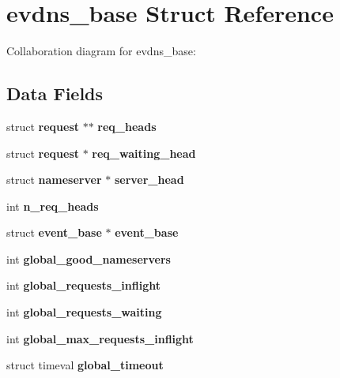 \section{evdns\-\_\-base \-Struct \-Reference}
\label{structevdns__base}


\-Collaboration diagram for evdns\-\_\-base\-:
\subsection*{\-Data \-Fields}
\begin{DoxyCompactItemize}
\item 
struct {\bf request} $\ast$$\ast$ {\bfseries req\-\_\-heads}\label{structevdns__base_a346219f57344018a7d4c3364cd47fd04}

\item 
struct {\bf request} $\ast$ {\bfseries req\-\_\-waiting\-\_\-head}\label{structevdns__base_acc93b195bd8704c1e13c8f2f7785ad0e}

\item 
struct {\bf nameserver} $\ast$ {\bfseries server\-\_\-head}\label{structevdns__base_abce33d9e0dba60766332c701af8c7a9f}

\item 
int {\bfseries n\-\_\-req\-\_\-heads}\label{structevdns__base_ac76cdaa1c35241e412a1c8d8d7661229}

\item 
struct {\bf event\-\_\-base} $\ast$ {\bfseries event\-\_\-base}\label{structevdns__base_ac1c1d71aa37cb71608f4f802bb85b200}

\item 
int {\bfseries global\-\_\-good\-\_\-nameservers}\label{structevdns__base_ad4dee3132b0efd37b89c8b27fe6f4596}

\item 
int {\bfseries global\-\_\-requests\-\_\-inflight}\label{structevdns__base_aac7a85997a48c47cb5055849b41edb67}

\item 
int {\bfseries global\-\_\-requests\-\_\-waiting}\label{structevdns__base_a7e4a52ab1b18f935d4d8e45b9414d37d}

\item 
int {\bfseries global\-\_\-max\-\_\-requests\-\_\-inflight}\label{structevdns__base_ac35209ad9d0ea4d0b6f04f236ad72d2a}

\item 
struct timeval {\bfseries global\-\_\-timeout}\label{structevdns__base_a27b245e2dc1df06773716dca8a3cc331}


\end{DoxyCompactItemize}
